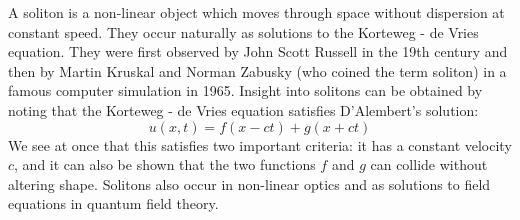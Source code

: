 \documentclass[12pt]{article}
\begin{document}
A soliton is a non-linear object which moves through space without dispersion at constant speed. They occur naturally as solutions to the Korteweg - de Vries equation. They were first observed by John Scott Russell in the 19th century and then by Martin Kruskal and Norman Zabusky (who coined the term soliton) in a famous computer simulation in 1965. Insight into solitons can be obtained by noting that the Korteweg - de Vries equation satisfies D'Alembert's solution:
\[
u(x, t) = f(x-ct) + g(x+ct)
\]
We see at once that this satisfies two important criteria: it has a constant velocity $c$, and it can also be shown that the two functions $f$ and $g$ can collide without altering shape. Solitons also occur in non-linear optics and as solutions to field equations in quantum field theory.
\end{document}
